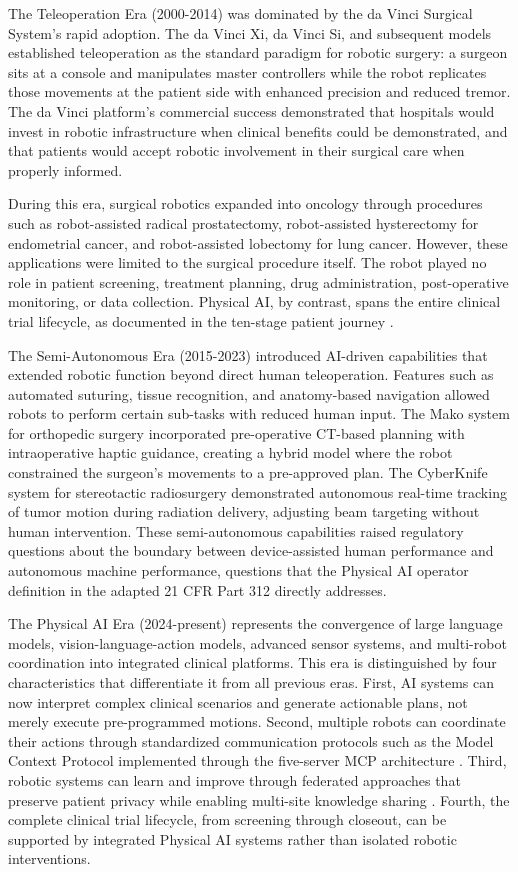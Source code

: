 The Teleoperation Era (2000-2014) was dominated by the da Vinci Surgical
System's rapid adoption. The da Vinci Xi, da Vinci Si, and subsequent
models established teleoperation as the standard paradigm for robotic
surgery: a surgeon sits at a console and manipulates master controllers while
the robot replicates those movements at the patient side with enhanced
precision and reduced tremor. The da Vinci platform's commercial success
demonstrated that hospitals would invest in robotic infrastructure when
clinical benefits could be demonstrated, and that patients would accept
robotic involvement in their surgical care when properly informed.

During this era, surgical robotics expanded into oncology through procedures
such as robot-assisted radical prostatectomy, robot-assisted hysterectomy for
endometrial cancer, and robot-assisted lobectomy for lung cancer. However,
these applications were limited to the surgical procedure itself. The robot
played no role in patient screening, treatment planning, drug
administration, post-operative monitoring, or data collection. Physical AI,
by contrast, spans the entire clinical trial lifecycle, as documented in the
ten-stage patient journey \cite{patient-journey-paper}.

The Semi-Autonomous Era (2015-2023) introduced AI-driven capabilities that
extended robotic function beyond direct human teleoperation. Features such as
automated suturing, tissue recognition, and anatomy-based navigation allowed
robots to perform certain sub-tasks with reduced human input. The Mako
system for orthopedic surgery incorporated pre-operative CT-based planning
with intraoperative haptic guidance, creating a hybrid model where the robot
constrained the surgeon's movements to a pre-approved plan. The CyberKnife
system for stereotactic radiosurgery demonstrated autonomous real-time
tracking of tumor motion during radiation delivery, adjusting beam targeting
without human intervention. These semi-autonomous capabilities raised
regulatory questions about the boundary between device-assisted human
performance and autonomous machine performance, questions that the Physical
AI operator definition in the adapted 21 CFR Part 312 \cite{cfr312-adapt}
directly addresses.

The Physical AI Era (2024-present) represents the convergence of large
language models, vision-language-action models, advanced sensor systems, and
multi-robot coordination into integrated clinical platforms. This era is
distinguished by four characteristics that differentiate it from all previous
eras. First, AI systems can now interpret complex clinical scenarios and
generate actionable plans, not merely execute pre-programmed motions.
Second, multiple robots can coordinate their actions through standardized
communication protocols such as the Model Context Protocol \cite{mcp-protocol}
implemented through the five-server MCP architecture
\cite{national-mcp-paper}. Third, robotic systems can learn and improve
through federated approaches that preserve patient privacy while enabling
multi-site knowledge sharing \cite{fl-paper}. Fourth, the complete clinical
trial lifecycle, from screening through closeout, can be supported by
integrated Physical AI systems rather than isolated robotic interventions.

